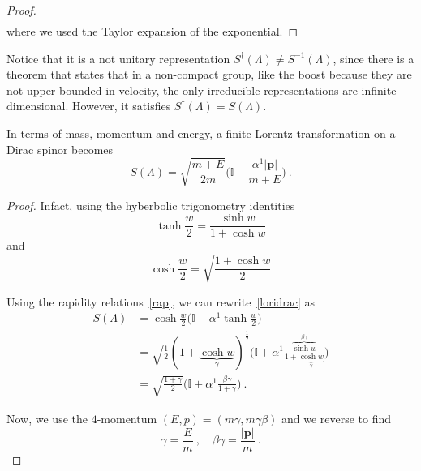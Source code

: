 \begin{example}
\begin{proof}
\begin{equation*}
\begin{aligned}
            \end{aligned}
            \end{equation*}
            where we used the Taylor expansion of the exponential.
        \end{proof}
        Notice that it is a not unitary representation $S^\dagger(\Lambda) \neq S^{-1}(\Lambda)$, since there is a theorem that states that in a non-compact group, like the boost because they are not upper-bounded in velocity, the only irreducible representations are infinite-dimensional. However, it satisfies $S^\dagger (\Lambda) = S(\Lambda)$.

        In terms of mass, momentum and energy, a finite Lorentz transformation on a Dirac spinor becomes 
        \begin{equation*}
            S(\Lambda) = \sqrt{\frac{m + E}{2m}} \Big( \mathbb I - \frac{\alpha^1 |\mathbf p|}{m + E} \Big) ~.
        \end{equation*}
        \begin{proof}
            Infact, using the hyberbolic trigonometry identities
            \begin{equation*}
                \tanh \frac{w}{2} = \frac{\sinh w}{1 + \cosh w}
            \end{equation*}
            and 
            \begin{equation*}
                \cosh \frac{w}{2} = \sqrt{\frac{1 + \cosh w}{2}}
            \end{equation*}

            Using the rapidity relations~\eqref{rap}, we can rewrite~\eqref{loridrac} as 
            \begin{equation*}
            \begin{aligned}
                S(\Lambda) & = \cosh \frac{w}{2} \Big( \mathbb I - \alpha^1 \tanh \frac{w}{2} \Big) \\ & = \sqrt{\frac{1}{2}} (1 + \underbrace{\cosh w}_{\gamma})^{\frac{1}{2}} \Big (\mathbb I + \alpha^1 \frac{\overbrace{\sinh w}^{\beta\gamma}}{1 + \underbrace{\cosh w}_\gamma} \Big) \\ & = \sqrt{\frac{1 + \gamma}{2}} \Big ( \mathbb I + \alpha^1 \frac{\beta \gamma}{1 + \gamma}\Big) ~.
            \end{aligned}
            \end{equation*}

            Now, we use the $4$-momentum $(E, p) = (m \gamma, m \gamma\beta)$ and we reverse to find 
            \begin{equation*}
                \gamma = \frac{E}{m} ~, \quad \beta \gamma = \frac{|\mathbf p|}{m} ~.
            \end{equation*}


\end{proof}
\end{example}
